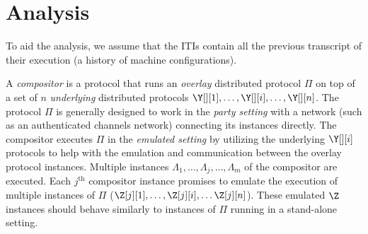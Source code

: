 \section{Analysis}

To aid the analysis, we assume that the ITIs contain all the previous transcript
of their execution (a history of machine configurations).

%

\begin{definition}[Lateness]
\end{definition}

\begin{definition}[Exec]
\end{definition}

\begin{definition}[View]
\end{definition}


A \emph{compositor} is a protocol that
runs an \emph{overlay} distributed protocol $\Pi$ on top of a set of
$n$ \emph{underlying} distributed protocols $\Y[][1], \ldots, \Y[][i], \ldots, \Y[][n]$.
The protocol $\Pi$ is generally designed
to work in the \emph{party setting} with a network (such as an authenticated channels network)
connecting its instances directly.
The compositor executes
$\Pi$ in the \emph{emulated setting} by utilizing the underlying
$\Y[][i]$ protocols to help with the emulation and communication between the
overlay protocol instances.
Multiple instances $\Lambda_1, \ldots, \Lambda_j, \ldots, \Lambda_m$
of the compositor are executed.
Each $j^\text{th}$ compositor instance promises to emulate the execution of multiple
instances of $\Pi$ ($\Z[j][1], \ldots, \Z[j][i], \ldots \Z[j][n]$).
These emulated $\Z$ instances should behave similarly to instances of $\Pi$
running in a stand-alone setting.

